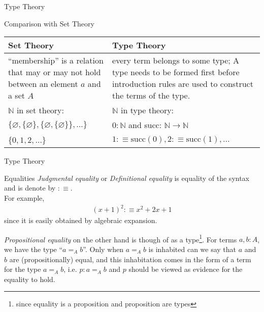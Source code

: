 \documentclass[10pt]{beamer}
\begin{document}
\begin{frame}{Type Theory}
\begin{block}{Comparison with Set Theory}
\begin{table}[h]
\centering
\small
\begin{tabular}{p{5cm}|p{5cm}}
\hline
Set Theory & Type Theory \\
\hline
 ``membership'' is a relation that may or may not hold between an element $a$ and a set $A$ & every term belongs to some type; A type needs to be formed first before introduction rules are used to construct the terms of the type.\\
 \hline
$\mathbb{N}$ in set theory: & $\mathbb{N}$ in type theory:\\$\{\varnothing, \{\varnothing\}, \{\varnothing, \{\varnothing\}\}, \ldots\}$&$0: \mathbb{N}$ and succ: $\mathbb{N} \to \mathbb{N}$\\
 \{$0, 1, 2, \ldots\}$ & $1:\equiv \text{succ}(0), 2:\equiv \text{succ}(1), \ldots$\\ 
 
\end{tabular}
\end{table}

\end{block}
\end{frame}


\begin{frame}{Type Theory}
\begin{block}{Equalities}
\emph{Judgmental equality} or \emph{Definitional equality} is equality of the syntax 	and is denote by $:\equiv$. \\For example,
\begin{align*}
(x+1)^2  :\equiv x^2+2x+1
\end{align*}
since it is easily obtained by algebraic expansion. 

\emph{Propositional equality} on the other hand is though of as a type\footnote{since equality is a proposition and proposition are types}. For terms $a, b : A$, we have the type ``$a =_Ab$''. Only when $a =_Ab$ is inhabited can we say that $a$ and $b$ are (propositionally) equal, and this inhabitation comes in the form of a term for the type $a =_Ab$, i.e. $p:a =_Ab$ and $p$ should be viewed as evidence for the equality to hold.
\end{block}
\end{frame}
\end{document}
